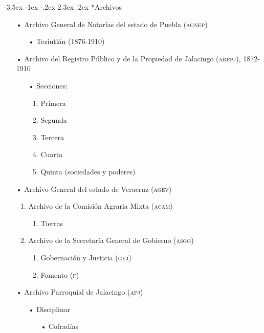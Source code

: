\documentclass[14pt,twoside,final]{extbook} %
\makeatletter
\renewcommand\section{\@startsection {section}{1}{\z@}%
                                     {-3.5ex \@plus -1ex \@minus -.2ex}%
                                     {2.3ex \@plus .2ex}%
                                     {\normalfont\large\bfseries\sc}}
\makeatother
\begin{document}
\section*{Archivos}\label{sec:archivos}
\begin{itemize}[noitemsep]
\item[•]Archivo General de Notarías del estado de Puebla (\textsc{agnep})
\begin{itemize}
\item[•]Teziutlán (1876-1910)
\end{itemize}
\end{itemize}
\begin{itemize}[noitemsep]
\item[•]Archivo del Registro Público y de la Propiedad de Jalacingo (\textsc{arppj}), 1872-1910
\begin{itemize}[noitemsep]
\item[•]Secciones:
\begin{enumerate}[noitemsep]
\item Primera
\item Segunda
\item Tercera
\item Cuarta
\item Quinta (sociedades y poderes)
\end{enumerate}
\end{itemize}
\end{itemize}
\begin{itemize}[noitemsep]
\item[•]Archivo General del estado de Veracruz (\textsc{agev})
\begin{enumerate}[noitemsep]
\item Archivo de la Comisión Agraria Mixta (\textsc{acam})
\begin{enumerate}[noitemsep]
\item Tierras
\end{enumerate}
\item Archivo de la Secretaría General de Gobierno (\textsc{asgg})
\begin{enumerate}[noitemsep]
\item Gobernación y Justicia (\textsc{gyj})
\item Fomento (\textsc{f})
\end{enumerate}
\end{enumerate}
\end{itemize}
\begin{itemize}[noitemsep]
\item[•]Archivo Parroquial de Jalacingo (\textsc{apj})
\begin{itemize}[noitemsep]
\item[•]Disciplinar
\begin{itemize}[noitemsep]
\item[•]Cofradías
\end{itemize}
\end{itemize}
\end{itemize}
\end{document}

